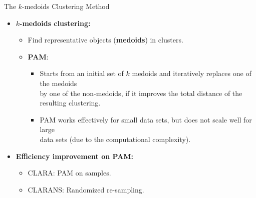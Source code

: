 \begin{frame}{The $k$-medoids Clustering Method}
	\begin{itemize}
		\item \textbf{$k$-medoids clustering:}
		      \begin{itemize}
			      \item Find representative objects (\textbf{\color{airforceblue}medoids}) in clusters.
			      \item \textbf{PAM}:
			            \begin{itemize}
				            \item Starts from an initial set of $k$ medoids and iteratively
				                  replaces one of the medoids \\
				                  by one of the non-medoids, if it improves the total distance of
				                  the resulting clustering.
				            \item PAM works effectively for small data sets, but does not
				                  scale well for large\\
				                  data sets (due to the computational complexity).
			            \end{itemize}
		      \end{itemize}
		\item \textbf{Efficiency improvement on PAM:}
		      \begin{itemize}
			      \item CLARA: PAM on samples.
			      \item CLARANS: Randomized re-sampling.
		      \end{itemize}
	\end{itemize}
\end{frame}

